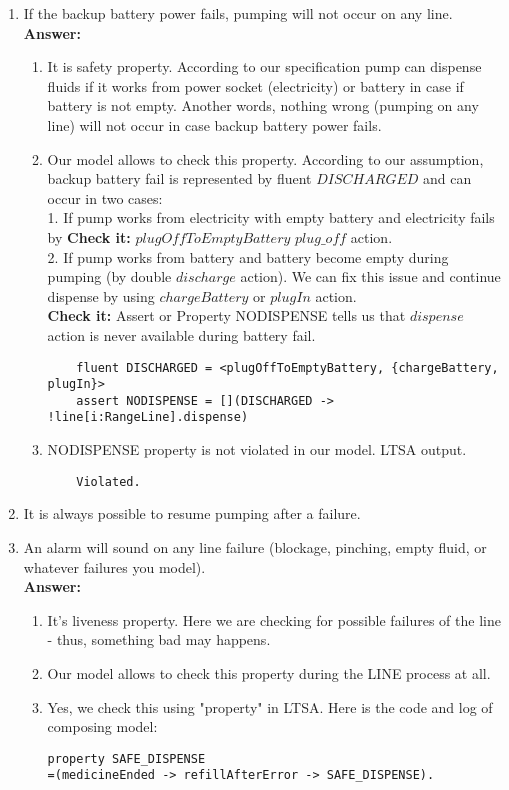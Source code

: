 \documentclass{article}
\begin{document}
\begin{enumerate}
    \item If the backup battery power fails, pumping will not occur on any line.\\
    \textbf{Answer:}
    \begin{enumerate}
    \item It is safety property. According to our specification pump can dispense fluids if it works from power
    socket (electricity) or battery in case if battery is not empty. Another words, nothing wrong (pumping on any line) will
    not occur in case backup battery power fails.
 
    \item Our model allows to check this property. According to our assumption, backup battery fail is represented by fluent
    $DISCHARGED$ and can occur in two cases:\\
    1. If pump works from electricity with empty battery and electricity fails by \textbf{Check it:} $plugOffToEmptyBattery$
    $plug\_off$ action.\\
    2. If pump works from battery and battery become empty during pumping (by double $discharge$ action).
    We can fix this issue and continue dispense by using $chargeBattery$ or $plugIn$ action.\\
    \textbf{Check it:} Assert or Property NODISPENSE tells us that $dispense$ action is never available during battery fail.
    \begin{verbatim}
    fluent DISCHARGED = <plugOffToEmptyBattery, {chargeBattery, plugIn}>
    assert NODISPENSE = [](DISCHARGED -> !line[i:RangeLine].dispense)
    \end{verbatim}
    
    \item NODISPENSE property is not violated in our model. LTSA output.
    \begin{verbatim}
    Violated.
    \end{verbatim} 
    \end{enumerate}    
    
    
    \item It is always possible to resume pumping after a failure.
    \item An alarm will sound on any line failure (blockage, pinching, empty fluid, or
whatever failures you model).\\
    \textbf{Answer:}
    \begin{enumerate}
    	\item It's liveness property. Here we are checking for possible failures of the line - thus, something bad may happens.
		\item Our model allows to check this property during the LINE process at all.
		\item Yes, we check this using "property" in LTSA. Here is the code and log of composing model:
\begin{verbatim}
property SAFE_DISPENSE
=(medicineEnded -> refillAfterError -> SAFE_DISPENSE).


\end{verbatim}
\end{enumerate}
\end{enumerate}
\end{document}
